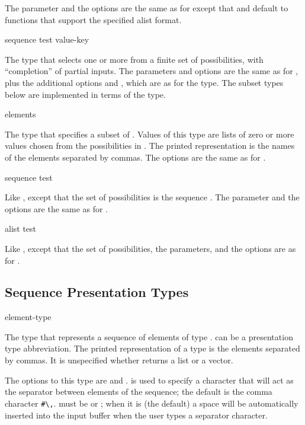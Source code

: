 The  parameter and the options are the same as for 
except that  and  default to functions
that support the specified alist format.


 {sequence \key test value-key}

The type that selects one or more from a finite set of possibilities, with
``completion'' of partial inputs.  The parameters and options are the same as
for , plus the additional options  and
, which are as for the  type.  The subset types
below are implemented in terms of the  type.


 {\rest elements}

The type that specifies a subset of .  Values of this type are
lists of zero or more values chosen from the possibilities in .
The printed representation is the names of the elements separated by commas.
The options are the same as for .


 {sequence \key test}

Like , except that the set of possibilities is the sequence
.  The parameter  and the options are the same as for
.


 {alist \key test}

Like , except that the set of possibilities, the parameters, and the
options are as for .


\subsection {Sequence Presentation Types}

 {element-type}

The type that represents a sequence of elements of type .
 can be a presentation type abbreviation.  The printed
representation of a  type is the elements separated by commas.
It is unspecified whether  returns a list or a vector.

The options to this type are  and .
 is used to specify a character that will act as the separator
between elements of the sequence; the default is the comma character \verb+#\,+.
 must be  or ; when it is 
(the default) a space will be automatically inserted into the input buffer when
the user types a separator character.


